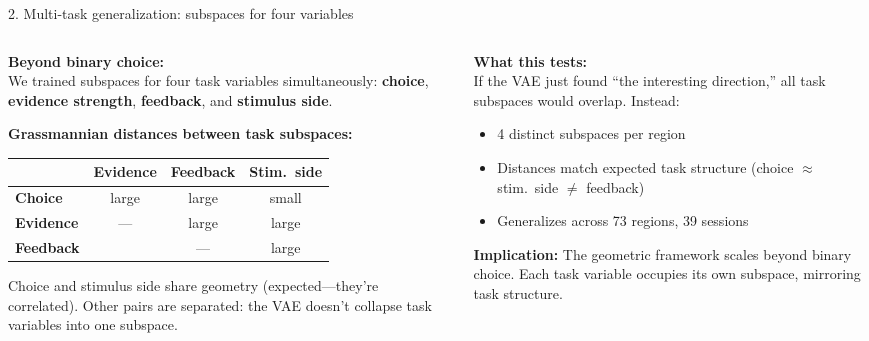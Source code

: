 \documentclass[aspectratio=169,11pt]{beamer}
\begin{document}
\begin{frame}{2. Multi-task generalization: subspaces for four variables}
\begin{columns}[T]
\begin{column}{0.48\textwidth}
\textbf{Beyond binary choice:}\\[0.3em]
{\small We trained subspaces for four task variables simultaneously: \textbf{choice}, \textbf{evidence strength}, \textbf{feedback}, and \textbf{stimulus side}.}

\vspace{0.5em}
\textbf{Grassmannian distances between task subspaces:}\\[0.3em]
{\scriptsize
\begin{tabular}{lccc}
\toprule
 & \textbf{Evidence} & \textbf{Feedback} & \textbf{Stim.\ side} \\
\midrule
\textbf{Choice} & large & large & \textcolor{fail}{small} \\
\textbf{Evidence} & --- & large & large \\
\textbf{Feedback} & & --- & large \\
\bottomrule
\end{tabular}
}

\vspace{0.5em}
{\small Choice and stimulus side share geometry (expected---they're correlated). Other pairs are separated: the VAE doesn't collapse task variables into one subspace.}
\end{column}
\begin{column}{0.50\textwidth}
\textbf{What this tests:}\\[0.2em]
{\small If the VAE just found ``the interesting direction,'' all task subspaces would overlap. Instead:}
\vspace{0.2em}
{\small
\begin{itemize}\setlength\itemsep{1pt}
  \item 4 distinct subspaces per region
  \item Distances match expected task structure (choice $\approx$ stim.\ side $\neq$ feedback)
  \item Generalizes across 73 regions, 39 sessions
\end{itemize}
}

\vspace{0.3em}
{\small \textbf{Implication:} The geometric framework scales beyond binary choice. Each task variable occupies its own subspace, mirroring task structure.}
\end{column}
\end{columns}
\end{frame}
\end{document}
